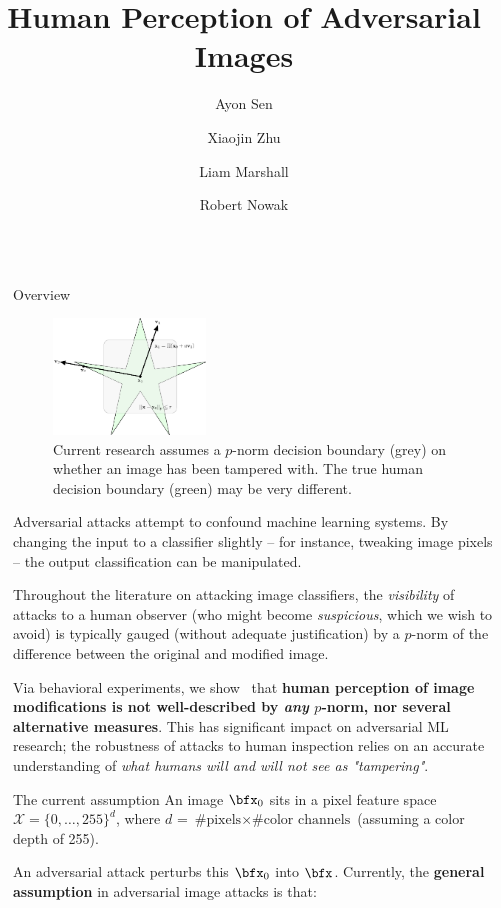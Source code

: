 \documentclass[final,notheorems]{beamer}
\title{Human Perception of Adversarial Images}
\author{Ayon Sen \inst{1} \and Xiaojin Zhu \inst{1} \and Liam Marshall \inst{1} \and Robert Nowak \inst{1}}
\institute[shortinst]{\inst{1} University of Wisconsin-Madison}
\newlength{\sepwidth}
\newlength{\colwidth}
\newcommand{\separatorcolumn}{\begin{column}{\sepwidth}\end{column}}
\def\X{\mathcal X}
\begin{document}
\begin{frame}[t]
\begin{columns}[t]
\separatorcolumn

\begin{column}{\colwidth}
  \begin{block}{Overview}
    \begin{figure}
      \centering
      \includegraphics[width=0.38\textwidth]{fig/intro_image-figure0.eps}
      \caption{Current research assumes a $p$-norm decision boundary (grey) on whether an image has been tampered with. The true human decision boundary (green) may be very different.}
      \label{fig:decision_boundary}
    \end{figure}
    Adversarial attacks attempt to confound machine learning systems. By changing the input to a classifier slightly -- for instance, tweaking image pixels -- the output classification can be manipulated.

    Throughout the literature on attacking image classifiers, the \emph{visibility} of attacks to a human observer (who might become \emph{suspicious}, which we wish to avoid) is typically gauged (without adequate justification) by a $p$-norm of the difference between the original and modified image.

    Via behavioral experiments, we show~\cite{sen2019perception} that \textbf{human perception of image modifications is not well-described by \emph{any} $p$-norm, nor several alternative measures}.
    This has significant impact on adversarial ML research; the robustness of attacks to human inspection relies on an accurate understanding of \emph{what humans will and will not see as "tampering"}.

  \end{block}

  \begin{alertblock}{The current assumption}
    An image $\bfx_0$ sits in a pixel feature space $\X = \{0,\ldots,255\}^d$, where $d$ = $\text{\# pixels} \times \text{\# color channels}$ (assuming a color depth of 255).

    An adversarial attack perturbs this $\bfx_0$ into $\bfx$. Currently, the \textbf{general assumption} in adversarial image attacks is that:


\end{alertblock}
\end{column}
\end{columns}
\end{frame}
\end{document}

